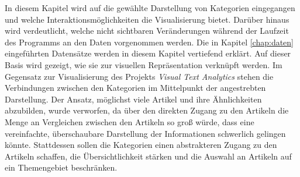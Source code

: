 
In diesem Kapitel wird auf die gewählte Darstellung von Kategorien eingegangen und welche Interaktionsmöglichkeiten die Visualisierung bietet.
Darüber hinaus wird verdeutlicht, welche nicht sichtbaren Veränderungen während der Laufzeit des Programms an den Daten vorgenommen werden.
Die in Kapitel \ref{chap:daten} eingeführten Datensätze werden in diesem Kapitel vertiefend erklärt. Auf dieser Basis wird gezeigt, wie sie zur visuellen Repräsentation verknüpft werden.
Im Gegensatz zur Visualisierung des Projekts \emph{Visual Text Analytics} stehen die Verbindungen zwischen den Kategorien im Mittelpunkt der angestrebten Darstellung.
Der Ansatz, möglichst viele Artikel und ihre Ähnlichkeiten abzubilden, wurde verworfen, da über den direkten Zugang zu den Artikeln die Menge an Vergleichen zwischen den Artikeln so groß würde, dass eine vereinfachte, überschaubare Darstellung der Informationen schwerlich gelingen könnte.
Stattdessen sollen die Kategorien einen abstrakteren Zugang zu den Artikeln schaffen, die Übersichtlichkeit stärken und die Auswahl an Artikeln auf ein Themengebiet beschränken.


